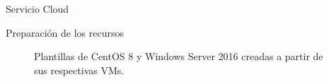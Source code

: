 \begin{subsection}{Servicio Cloud}
\begin{subsubsection}{Preparación de los recursos}
\begin{figure}[h]
        \caption{Plantillas de CentOS 8 y Windows Server 2016 creadas a partir de sus respectivas VMs.}
        \label{fig:templates}
    \end{figure}
    \FloatBarrier

    \end{subsubsection}


\end{subsection}
